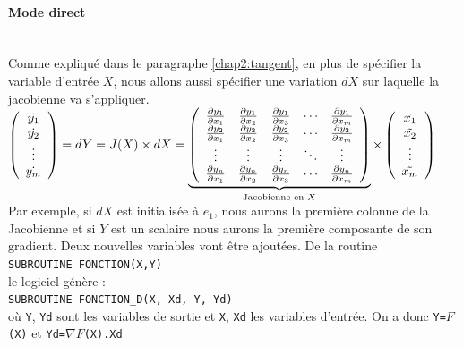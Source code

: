 \paragraph{Mode direct} \hfill \\
Comme expliqu\'e dans le paragraphe \ref{chap2:tangent}, en plus de sp\'ecifier la variable d'entr\'ee $X$,
 nous allons aussi sp\'ecifier une variation $dX$ sur
 laquelle la jacobienne va s'appliquer.\\


$\left( 
\begin{array}{c} 
\dot{y_1} \\
\dot{y_2} \\
\vdots \\
\dot{y_m}

\end{array}
\right)
=dY = J(X) \times dX =
\underbrace{
\left( 
\begin{array}{ccccc} 
\frac{\partial y_1}{\partial x_1} & \frac{\partial y_1}{\partial x_2} &
 \frac{\partial y_1}{\partial x_3} & \cdots & \frac{\partial y_1}{\partial x_m} \\
\frac{\partial y_2}{\partial x_1} & \frac{\partial y_2}{\partial x_2} &
 \frac{\partial y_2}{\partial x_3} & \cdots & \frac{\partial y_2}{\partial x_m} \\
\vdots & \vdots & \vdots & \ddots & \vdots \\
\frac{\partial y_n}{\partial x_1} & \frac{\partial y_n}{\partial x_2} &
 \frac{\partial y_n}{\partial x_3} & \cdots & \frac{\partial y_n}{\partial x_m} \\
\end{array}
\right)}_{\text{Jacobienne en }X}
 \times
\left( 
\begin{array}{c} 
\Tilde{x_1} \\
\Tilde{x_2} \\
\vdots \\
\Tilde{x_m}
\end{array}
\right)
 $ \\
%
Par exemple, si $dX$ est initialis\'ee \`a $e_1$, nous aurons la premi\`ere colonne de la Jacobienne et si $Y$ est un scalaire 
nous aurons la premi\`ere composante de son gradient. Deux nouvelles variables vont être ajout\'ees. De la routine\\
\verb!SUBROUTINE FONCTION(X,Y)!\\
le logiciel g\'en\`ere :\\
\verb!SUBROUTINE FONCTION_D(X, Xd, Y, Yd)!\\
o\`u {\tt Y}, {\tt Yd} sont les variables de sortie et {\tt X}, {\tt Xd} les variables d'entr\'ee. On a donc
{\tt Y=}$F${\tt (X)} et {\tt Yd=}$\nabla F${\tt (X).Xd}


